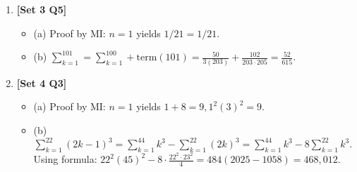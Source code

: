\documentclass[12pt, a4paper]{article} %
\begin{document}
\begin{enumerate}
    \item \textbf{[Set 3 Q5]}
    \begin{itemize}
        \item (a) Proof by MI: $n=1$ yields $1/21 = 1/21$.
        \item (b) $\sum_{k=1}^{101} = \sum_{k=1}^{100} + \text{term}(101) = \frac{50}{3(203)} + \frac{102}{203 \cdot 205} = \frac{52}{615}$.
    \end{itemize}

    \item \textbf{[Set 4 Q3]}
    \begin{itemize}
        \item (a) Proof by MI: $n=1$ yields $1+8=9, 1^2(3)^2=9$.
        \item (b) $\sum_{k=1}^{22} (2k-1)^3 = \sum_{k=1}^{44} k^3 - \sum_{k=1}^{22} (2k)^3 = \sum_{k=1}^{44} k^3 - 8 \sum_{k=1}^{22} k^3$. Using formula: $22^2(45)^2 - 8 \cdot \frac{22^2 \cdot 23^2}{4} = 484(2025 - 1058) = 468,012$.
    \end{itemize}
\end{enumerate}
\end{document}
